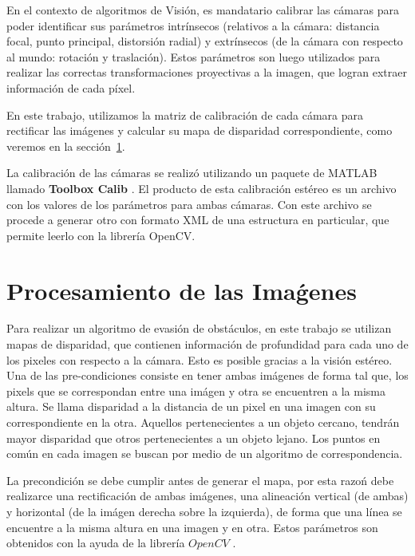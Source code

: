 \documentclass[journal]{IEEEtran}
\begin{document}
En el contexto de algoritmos de Visi\'on, es mandatario calibrar las c\'amaras para poder identificar sus par\'ametros intr\'insecos (relativos a la c\'amara: distancia focal, punto principal, distorsi\'on radial) y extr\'insecos (de la c\'amara con respecto al mundo: rotaci\'on y traslaci\'on). Estos par\'ametros son luego utilizados para realizar las correctas transformaciones proyectivas a la imagen, que logran extraer informaci\'on de cada p\'ixel.

En este trabajo, utilizamos la matriz de calibraci\'on de cada c\'amara para rectificar las im\'agenes y calcular su mapa de disparidad correspondiente, como veremos en la secci\'on~\ref{sec:pro_img}.

La calibraci\'on de las c\'amaras se realiz\'o utilizando un paquete de MATLAB llamado {\bf Toolbox Calib} \cite{B00}. El producto de esta calibraci\'on est\'ereo es un archivo con los valores de los par\'ametros para ambas c\'amaras. Con este archivo se procede a generar otro con formato XML de una estructura en particular, que permite leerlo con la librer\'ia OpenCV.

\section{Procesamiento de las Ima\'genes}
\label{sec:pro_img}

Para realizar un algoritmo de evasi\'on de obst\'aculos, en este trabajo se utilizan mapas de disparidad, que contienen informaci\'on de profundidad para cada uno de los pixeles con respecto a la c\'amara. Esto es posible gracias a la visi\'on est\'ereo. Una de las pre-condiciones consiste en tener ambas im\'agenes de forma tal que, los pixels que se correspondan entre una im\'agen y otra se encuentren a la misma altura. Se llama disparidad a la distancia de un pixel en una imagen con su correspondiente en la otra. Aquellos pertenecientes a un objeto cercano, tendr\'an mayor disparidad que otros pertenecientes a un objeto lejano. Los puntos en com\'un en cada imagen se buscan por medio de un algoritmo de correspondencia.

La precondici\'on se debe cumplir antes de generar el mapa, por esta razo\'n debe realizarce una rectificaci\'on de ambas im\'agenes, una alineaci\'on vertical (de ambas) y horizontal (de la im\'agen derecha sobre la izquierda), de forma que una l\'inea se encuentre a la misma altura en una imagen y en otra. Estos par\'ametros son obtenidos con la ayuda de la librer\'ia $OpenCV$ \cite{opencv}.
\end{document}
